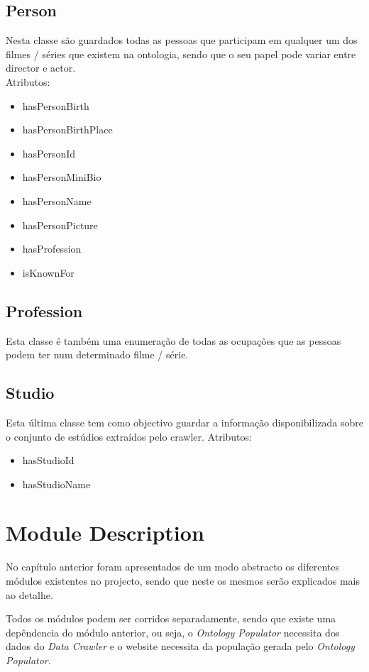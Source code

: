 \documentclass[a4paper]{article}
\begin{document}
\subsection{Person}
\indent \indent Nesta classe são guardados todas as pessoas que participam em qualquer um dos filmes / séries que existem na ontologia, sendo que o seu papel pode variar entre director e actor.\\
Atributos:
\begin{itemize}
	\item hasPersonBirth
	\item hasPersonBirthPlace
	\item hasPersonId
	\item hasPersonMiniBio
	\item hasPersonName
	\item hasPersonPicture
	\item hasProfession
	\item isKnownFor
\end{itemize}

\subsection{Profession}
\indent \indent Esta classe é também uma enumeração de todas as ocupações que as pessoas podem ter num determinado filme / série.

\subsection{Studio}
\indent \indent Esta última classe tem como objectivo guardar a informação disponibilizada sobre o conjunto de estúdios extraídos pelo crawler.
Atributos:
\begin{itemize}
	\item hasStudioId
	\item hasStudioName
\end{itemize}

\section{Module Description}
\indent \indent No capítulo anterior foram apresentados de um modo abstracto os diferentes módulos existentes no projecto, sendo que neste os mesmos serão explicados mais ao detalhe.

Todos os módulos podem ser corridos separadamente, sendo que existe uma depêndencia do módulo anterior, ou seja, o \textit{Ontology Populator} necessita dos dados do \textit{Data Crawler} e o website necessita da população gerada pelo \textit{Ontology Populator}.
\end{document}
